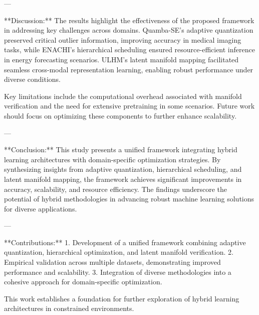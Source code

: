 ---

**Discussion:**  
The results highlight the effectiveness of the proposed framework in addressing key challenges across domains. Quamba-SE's adaptive quantization preserved critical outlier information, improving accuracy in medical imaging tasks, while ENACHI's hierarchical scheduling ensured resource-efficient inference in energy forecasting scenarios. ULHM's latent manifold mapping facilitated seamless cross-modal representation learning, enabling robust performance under diverse conditions.

Key limitations include the computational overhead associated with manifold verification and the need for extensive pretraining in some scenarios. Future work should focus on optimizing these components to further enhance scalability.

---

**Conclusion:**  
This study presents a unified framework integrating hybrid learning architectures with domain-specific optimization strategies. By synthesizing insights from adaptive quantization, hierarchical scheduling, and latent manifold mapping, the framework achieves significant improvements in accuracy, scalability, and resource efficiency. The findings underscore the potential of hybrid methodologies in advancing robust machine learning solutions for diverse applications.

---

**Contributions:**  
1. Development of a unified framework combining adaptive quantization, hierarchical optimization, and latent manifold verification.  
2. Empirical validation across multiple datasets, demonstrating improved performance and scalability.  
3. Integration of diverse methodologies into a cohesive approach for domain-specific optimization.

This work establishes a foundation for further exploration of hybrid learning architectures in constrained environments.